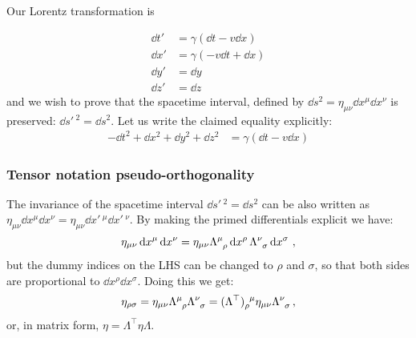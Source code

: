 \documentclass[main.tex]{subfiles}
\begin{document}
Our Lorentz transformation is

\begin{subequations}
\begin{align}
    \dd{t}' &= \gamma (\dd{t} - v \dd{x}) \\
    \dd{x}' &= \gamma (-v\dd{t} + \dd{x}) \\
    \dd{y}' &= \dd{y} \\
    \dd{z}' &= \dd{z}
\end{align}
\end{subequations}
%
and we wish to prove that the spacetime interval, defined by $\dd{s^2} = \eta_{\mu\nu} \dd{x^\mu}\dd{x^\nu}$ is preserved: $\dd{s'\,^2} = \dd{s^2}$.
Let us write the claimed equality explicitly:
%
\begin{subequations}
\begin{align}
    -\dd{t^2} + \dd{x^2}+ \dd{y^2}+ \dd{z^2}
    &= \gamma (\dd{t} - v \dd{x})
\end{align}
\end{subequations}


\subsubsection{Tensor notation pseudo-orthogonality}

The invariance of the spacetime interval $\dd{s'\,^2} = \dd{s^2}$ can be also written as \(\eta_{\mu\nu} \dd{x^\mu} \dd{x^\nu} = \eta_{\mu\nu} \dd{x'\,^\mu} \dd{x'\,^\nu}\). By making the primed differentials explicit we have:
%
\begin{equation}
  \eta_{\mu\nu} \dd{x^\mu} \dd{x^\nu}
  =
  \eta_{\mu\nu} \tensor{\Lambda}{^\mu_\rho} \dd{x^\rho} \tensor{\Lambda}{^\nu_\sigma} \dd{x^\sigma} \,,
\end{equation}
%
but the dummy indices on the LHS can be changed to \(\rho\) and \(\sigma\), so that both sides are proportional to  \(\dd{x^\rho}\dd{x^\sigma}\). Doing this we get:
%
\begin{equation}
  \eta_{\rho\sigma}
  =
  \eta_{\mu\nu} \tensor{\Lambda}{^\mu_\rho} \tensor{\Lambda}{^\nu_\sigma}
  =\tensor{(\Lambda^\top)}{_\rho^\mu} \eta_{\mu\nu} \tensor{\Lambda}{^\nu_\sigma} \,,
\end{equation}
%
or, in matrix form, \(\eta = \Lambda^\top \eta \Lambda\).

\end{document}
